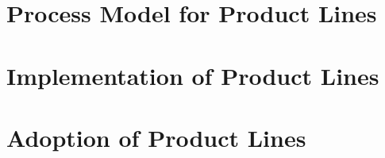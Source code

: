 \documentclass[
	aspectratio=169, %
	8pt, %
	handout, %
]{beamer}
\subtitle{8. Development Process}
\author{Thomas Thüm, Elias Kuiter, Timo Kehrer}
\begin{document}


\section{Process Model for Product Lines}



\lessonslearned{
	\item \ldots
}{
	\item \ldots
}{
	\ldots
}

\sectionend

\section{Implementation of Product Lines}




\sectionend

\section{Adoption of Product Lines}



\lessonslearned{
	\item \ldots
}{
	\item \ldots
}{
	\ldots
}

\begin{frame}{\inserttitle}
	\lectureseriesoverview[II]
\end{frame}


\end{document}
